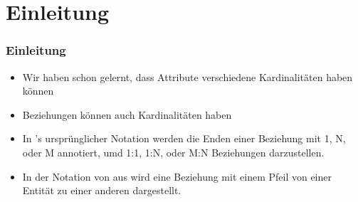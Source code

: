 \documentclass[aspectratio=169,mathserif,notheorems]{beamer}%
\subtitle{31.~Konzeptuelles Schema:~Beziehungskardinalität}%
\begin{document}
%
%
\startPresentation%
%
\section{Einleitung}%
%
\begin{frame}[t]%
\frametitle{Einleitung}%
\begin{itemize}%
\item Wir haben schon gelernt, dass Attribute verschiedene Kardinalitäten haben können%
%
\item<3-> Beziehungen können auch Kardinalitäten haben%
%
\item<7->  In \citeauthor{C1976TERMTAUVOD}'s ursprünglicher  Notation\cite{C1976TERMTAUVOD} werden die Enden einer Beziehung mit 1, N, oder M annotiert, umd 1:1, 1:N, oder M:N Beziehungen darzustellen.%
%
\item<8-> In der Notation von \citeauthor{B1969DSD}\cite{B1969DSD} aus \citeyear{B1969DSD} wird eine Beziehung mit einem Pfeil von einer Entität zu einer anderen dargestellt.%
\end{itemize}%
%
%
%
%
%
\end{frame}%
%
\end{document}
